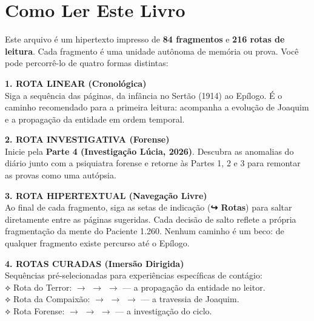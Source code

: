 \cleardoublepage
\thispagestyle{empty}
\chapter*{Como Ler Este Livro}

\begingroup

Este arquivo é um hipertexto impresso de \textbf{84 fragmentos} e \textbf{216 rotas de leitura}. Cada fragmento é uma unidade autônoma de memória ou prova. Você pode percorrê-lo de quatro formas distintas:

\vspace{0.8em}

\noindent\textbf{1. ROTA LINEAR (Cronológica)}\\
\noindent Siga a sequência das páginas, da infância no Sertão (1914) ao Epílogo. É o caminho recomendado para a primeira leitura: acompanha a evolução de Joaquim e a propagação da entidade em ordem temporal.

\vspace{0.5em}

\noindent\textbf{2. ROTA INVESTIGATIVA (Forense)}\\
\noindent Inicie pela \textbf{Parte 4 (Investigação Lúcia, 2026)}. Descubra as anomalias do diário junto com a psiquiatra forense e retorne às Partes 1, 2 e 3 para remontar as provas como uma autópsia.

\vspace{0.5em}

\noindent\textbf{3. ROTA HIPERTEXTUAL (Navegação Livre)}\\
\noindent Ao final de cada fragmento, siga as setas de indicação (\textbf{↪ Rotas}) para saltar diretamente entre as páginas sugeridas. Cada decisão de salto reflete a própria fragmentação da mente do Paciente 1.260. Nenhum caminho é um beco: de qualquer fragmento existe percurso até o Epílogo.

\vspace{0.5em}

\noindent\textbf{4. ROTAS CURADAS (Imersão Dirigida)}\\
\noindent Sequências pré-selecionadas para experiências específicas de contágio:\\[0.3em]
\noindent\textcolor{sangue}{⟡ Rota do Terror:}  $\rightarrow$  $\rightarrow$  $\rightarrow$  --- a propagação da entidade no leitor.\\[0.2em]
\noindent\textcolor{sangue}{⟡ Rota da Compaixão:}  $\rightarrow$  $\rightarrow$  $\rightarrow$  --- a travessia de Joaquim.\\[0.2em]
\noindent\textcolor{sangue}{⟡ Rota Forense:}  $\rightarrow$  $\rightarrow$  $\rightarrow$  --- a investigação do ciclo.

